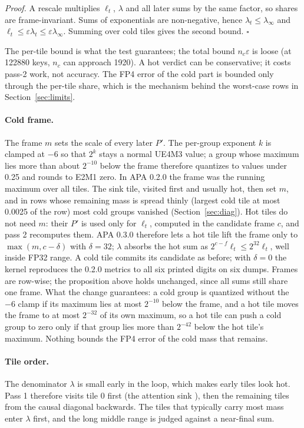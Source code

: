 \documentclass[10pt,twocolumn]{article}
\newcommand{\eps}{\varepsilon}
\begin{document}
\smallskip\noindent\emph{Proof.} A rescale multiplies $\ell_t$, $\lambda$ and all later sums by the same
factor, so shares are frame-invariant. Sums of exponentials are non-negative, hence $\lambda_t\le\lambda_\infty$
and $\ell_t\le\eps\lambda_t\le\eps\lambda_\infty$. Summing over cold tiles gives the second bound. $\square$

\smallskip The per-tile bound is what the test guarantees; the total bound $n_c\eps$ is loose (at 122880
keys, $n_c$ can approach 1920). A hot verdict can be conservative; it costs pass-2 work, not accuracy.
The FP4 error of the cold part is bounded only through the per-tile share, which is the mechanism behind
the worst-case rows in Section~\ref{sec:limits}.

\paragraph{Cold frame.}
\label{sec:coldframe}
The frame $m$ sets the scale of every later $P'$. The per-group exponent $k$ is clamped at $-6$ so that
$2^k$ stays a normal UE4M3 value; a group whose maximum lies more than about $2^{-10}$ below the frame
therefore quantizes to values under 0.25 and rounds to E2M1 zero. In APA 0.2.0 the frame was the running
maximum over all tiles. The sink tile, visited first and usually hot, then set $m$, and in rows whose
remaining mass is spread thinly (largest cold tile at most 0.0025 of the row) most cold groups vanished
(Section~\ref{sec:diag}).
Hot tiles do not need $m$: their $P'$ is used only for $\ell_t$, computed in the candidate frame $c$, and
pass 2 recomputes them. APA 0.3.0 therefore lets a hot tile lift the frame only to $\max(m, c-\delta)$ with
$\delta=32$; $\lambda$ absorbs the hot sum as $2^{c-f}\ell_t\le2^{32}\ell_t$, well inside FP32 range. A cold
tile commits its candidate as before; with $\delta=0$ the kernel reproduces the 0.2.0 metrics to all six
printed digits on six dumps. Frames are row-wise; the proposition above holds unchanged, since all sums still
share one frame. What the change guarantees: a cold group is quantized without the $-6$ clamp if its maximum
lies at most $2^{-10}$ below the frame, and a hot tile moves the frame to at most $2^{-32}$ of its own
maximum, so a hot tile can push a cold group to zero only if that group lies more than $2^{-42}$ below the
hot tile's maximum. Nothing bounds the FP4 error of the cold mass that remains.

\paragraph{Tile order.} The denominator $\lambda$ is small early in the loop, which makes early tiles look
hot. Pass 1 therefore visits tile 0 first (the attention sink \cite{xiao2024streamingllm}), then the
remaining tiles from the causal diagonal backwards. The tiles that typically carry most mass enter $\lambda$
first, and the long middle range is judged against a near-final sum.
\end{document}
